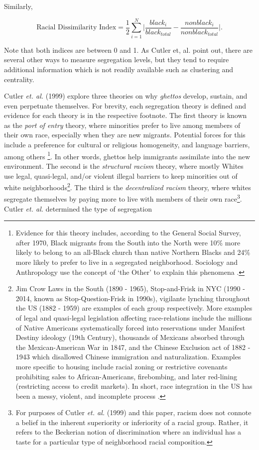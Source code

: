 \documentclass[11pt]{asaproc}
\newcommand{\1}{\mathbb{1}}
\begin{document}
Similarly,

\begin{equation}
\label{eq:rdi}
\mbox{Racial Dissimilarity Index} = \frac{1}{2}\sum_{i=1}^N\bigg|\frac{black_i}{black_{total}}-\frac{nonblack_i }{nonblack_{total}} \bigg| .
\end{equation}

{\setlength{\parindent}{0cm}Note that both indices are between 0 and 1. As Cutler et, al. point out, there are several other ways to measure segregation levels, but they tend to require additional information which is not readily available such as clustering and centrality.
}

Cutler \textit{et. al.} (1999) explore three theories on why \textit{ghettos} develop, sustain, and even perpetuate themselves. For brevity, each segregation theory is defined and evidence for each theory is in the respective footnote. The first theory is known as the \textit{port of entry} theory, where minorities prefer to live among members of their own race, especially when they are new migrants. Potential forces for this include a preference for cultural or religious homogeneity, and language barriers, among others \footnote{Evidence for this theory includes, according to the General Social Survey, after 1970, Black migrants from the South into the North were 10\% more likely to belong to an all-Black church than native Northern Blacks and 24\% more likely to prefer to live in a segregated neighborhood. Sociology and Anthropology use the concept of `the Other' to explain this phenomena \citep{mead62}.}. In other words, ghettos help immigrants assimilate into the new environment. The second is the \textit{structural racism} theory, where mostly Whites use legal, quasi-legal, and/or violent illegal barriers to keep minorities out of white neighborhoods\footnote{Jim Crow Laws in the South (1890 - 1965), Stop-and-Frisk in NYC (1990 - 2014, known as Stop-Question-Frisk in 1990s), vigilante lynching throughout the US (1882 - 1959) are examples of each group respectively\citep{black03}. More examples of legal and quasi-legal legislation affecting race-relations include the millions of Native Americans systematically forced into reservations under Manifest Destiny ideology (19th Century), thousands of Mexicans absorbed through the Mexican-American War in 1847, and the Chinese Exclusion act of 1882 - 1943 which disallowed Chinese immigration and naturalization. Examples more specific to housing include racial zoning or restrictive covenants prohibiting sales to African-Americans, firebombing, and later red-lining (restricting access to credit markets)\citep{spear67}. In short, race integration in the US has been a messy, violent, and incomplete process \citep{black03}.}. The third is the \textit{decentralized racism} theory, where whites segregate themselves by paying more to live with members of their own race\footnote{For purposes of Cutler \textit{et. al.} (1999) and this paper, racism does not connote a belief in the inherent superiority or inferiority of a racial group. Rather, it refers to the Beckerian notion of discrimination where an individual has a taste for a particular type of neighborhood racial composition.}. Cutler \textit{et. al.} determined the type of segregation 
\end{document}
